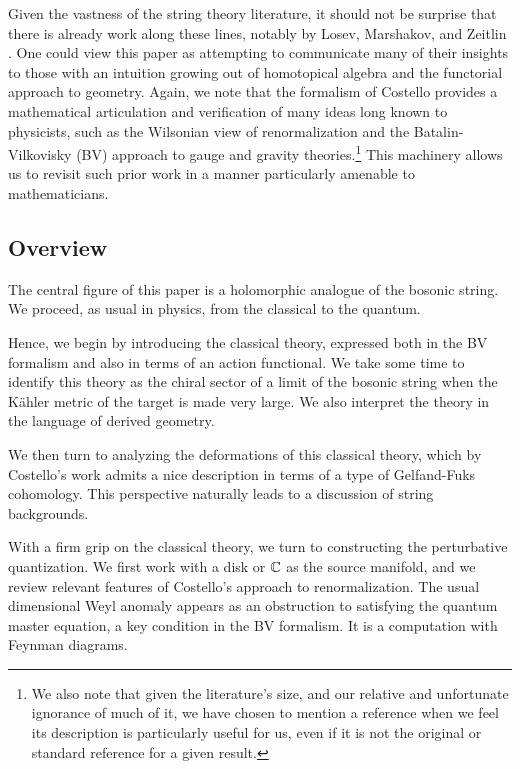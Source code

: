 Given the vastness of the string theory literature,
it should not be surprise that there is already work along these lines,
notably by Losev, Marshakov, and Zeitlin \cite{LMZ}.
One could view this paper as attempting to communicate many of their insights to those with an intuition growing out of homotopical algebra and the functorial approach to geometry.
Again, we note that the formalism of Costello provides a mathematical articulation and verification of many ideas long known to physicists, such as the Wilsonian view of renormalization and the Batalin-Vilkovisky (BV) approach to gauge and gravity theories.\footnote{We also note that given the literature's size,
and our relative and unfortunate ignorance of much of it,
we have chosen to mention a reference when we feel its description is particularly useful for us, 
even if it is not the original or standard reference for a given result.}
This machinery allows us to revisit such prior work in a manner particularly amenable to mathematicians.

\subsection{Overview} \label{sec:bvoverview}

The central figure of this paper is a holomorphic analogue of the bosonic string.
We proceed, as usual in physics, from the classical to the quantum.

Hence, we begin by introducing the classical theory, 
expressed both in the BV formalism and also in terms of an action functional.
We take some time to identify this theory as the chiral sector of a limit of the bosonic string when the K\"{a}hler metric of the target is made very large. 
We also interpret the theory in the language of derived geometry.

We then turn to analyzing the deformations of this classical theory,
which by Costello's work admits a nice description in terms of a type of Gelfand-Fuks cohomology.
This perspective naturally leads to a discussion of string backgrounds.

With a firm grip on the classical theory, we turn to constructing the perturbative quantization.
We first work with a disk or $\mathbb C$ as the source manifold,
and we review relevant features of Costello's approach to renormalization.
The usual dimensional Weyl anomaly appears as an obstruction to satisfying the quantum master equation,
a key condition in the BV formalism.
It is a computation with Feynman diagrams.

